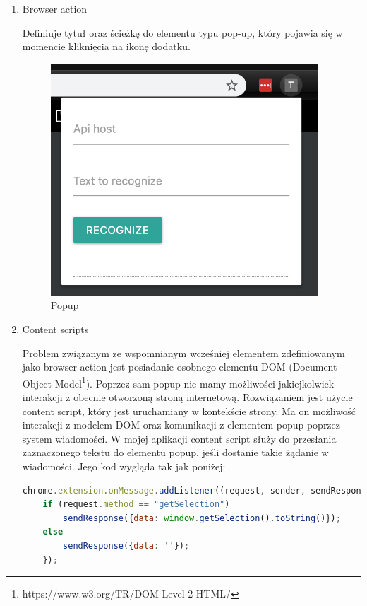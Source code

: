 \begin{enumerate}
    \item Browser action
    
    Definiuje tytuł oraz ścieżkę do elementu typu pop-up, który pojawia się w momencie kliknięcia na ikonę dodatku.
    
    \begin{figure}[H]
    \centering
    \includegraphics[width=10cm]{images/implementacja/popup.png}
    \caption{Popup}
    \end{figure}
    
    \item Content scripts
    
    Problem związanym ze wspomnianym wcześniej elementem zdefiniowanym jako browser action jest posiadanie osobnego elementu DOM (Document Object Model\footnote{https://www.w3.org/TR/DOM-Level-2-HTML/}). Poprzez sam popup nie mamy możliwości jakiejkolwiek interakcji z obecnie otworzoną stroną internetową. Rozwiązaniem jest użycie content script, który jest uruchamiany w kontekście strony. Ma on możliwość interakcji z modelem DOM oraz komunikacji z elementem popup poprzez system wiadomości. W mojej aplikacji content script służy do przesłania zaznaczonego tekstu do elementu popup, jeśli dostanie takie żądanie w wiadomości. Jego kod wygląda tak jak poniżej:
    
    \begin{lstlisting}[language=javascript]
    chrome.extension.onMessage.addListener((request, sender, sendResponse) => {
    if (request.method == "getSelection")
        sendResponse({data: window.getSelection().toString()});
    else
        sendResponse({data: ''});
    });
    \end{lstlisting}
    

\end{enumerate}
